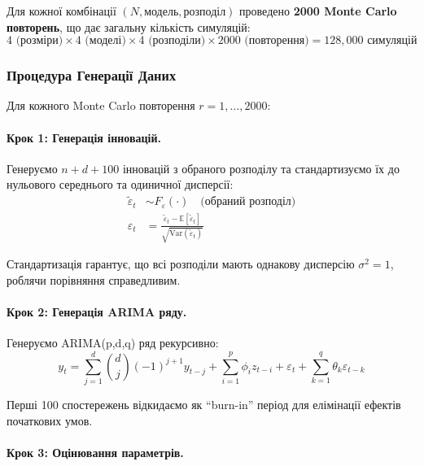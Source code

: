 \documentclass[12pt,a4paper]{article}
\begin{document}
Для кожної комбінації $(N, \text{модель}, \text{розподіл})$ проведено \textbf{2000 Monte Carlo повторень}, що дає загальну кількість симуляцій:
\begin{equation}
\label{eq:total_simulations}
4 \text{ (розміри)} \times 4 \text{ (моделі)} \times 4 \text{ (розподіли)} \times 2000 \text{ (повторення)} = 128{,}000 \text{ симуляцій}
\end{equation}

\subsubsection{Процедура Генерації Даних}

Для кожного Monte Carlo повторення $r = 1, \ldots, 2000$:

\paragraph{Крок 1: Генерація інновацій.}

Генеруємо $n + d + 100$ інновацій з обраного розподілу та стандартизуємо їх до нульового середнього та одиничної дисперсії:
\begin{align}
\tilde{\varepsilon}_t &\sim F_{\varepsilon}(\cdot) \quad \text{(обраний розподіл)} \label{eq:raw_innovations} \\
\varepsilon_t &= \frac{\tilde{\varepsilon}_t - \mathbb{E}[\tilde{\varepsilon}_t]}{\sqrt{\text{Var}(\tilde{\varepsilon}_t)}} \label{eq:standardized_innovations}
\end{align}

Стандартизація гарантує, що всі розподіли мають однакову дисперсію $\sigma^2 = 1$, роблячи порівняння справедливим.

\paragraph{Крок 2: Генерація ARIMA ряду.}

Генеруємо ARIMA(p,d,q) ряд рекурсивно:
\begin{equation}
\label{eq:arima_generation}
y_t = \sum_{j=1}^{d} \binom{d}{j} (-1)^{j+1} y_{t-j} + \sum_{i=1}^{p} \phi_i z_{t-i} + \varepsilon_t + \sum_{k=1}^{q} \theta_k \varepsilon_{t-k}
\end{equation}

Перші 100 спостережень відкидаємо як ``burn-in'' період для елімінації ефектів початкових умов.

\paragraph{Крок 3: Оцінювання параметрів.}
\end{document}
